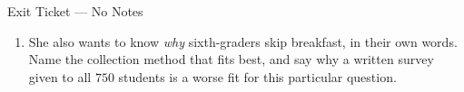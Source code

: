 \documentclass[10pt]{article}
\begin{document}
\begin{notesbox}{Exit Ticket --- No Notes}
\begin{enumerate}[leftmargin=1.6em, itemsep=8pt, topsep=3pt]
  \item She also wants to know \emph{why} sixth-graders skip breakfast, in their
        own words. Name the collection method that fits best, and say why a
        written survey given to all $750$ students is a worse fit for this
        particular question.

\end{enumerate}
\end{notesbox}
\end{document}
